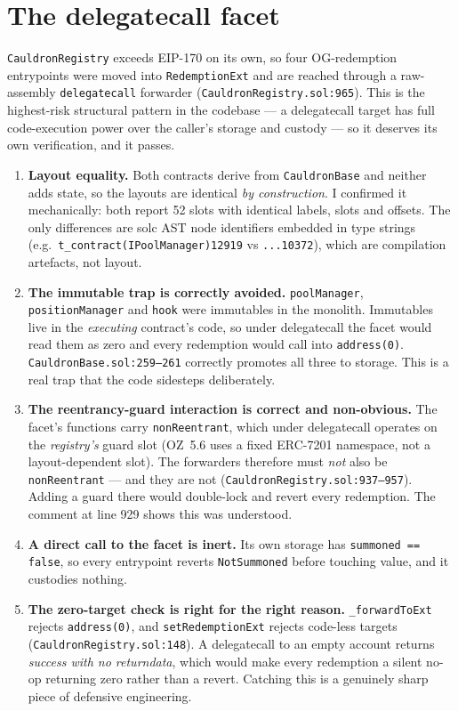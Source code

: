 \documentclass[10pt,a4paper]{article}
\newcommand{\code}[1]{\texttt{\small #1}}
\begin{document}
\section{The delegatecall facet}
\label{sec:facet}

\code{CauldronRegistry} exceeds EIP-170 on its own, so four OG-redemption
entrypoints were moved into \code{RedemptionExt} and are reached through a
raw-assembly \code{delegatecall} forwarder (\code{CauldronRegistry.sol:965}).
This is the highest-risk structural pattern in the codebase --- a delegatecall
target has full code-execution power over the caller's storage and custody ---
so it deserves its own verification, and it passes.

\begin{enumerate}
\item \textbf{Layout equality.} Both contracts derive from
\code{CauldronBase} and neither adds state, so the layouts are identical
\emph{by construction}. I confirmed it mechanically: both report 52 slots with
identical labels, slots and offsets. The only differences are solc AST node
identifiers embedded in type strings (e.g.\ \code{t\_contract(IPoolManager)12919}
vs \code{...10372}), which are compilation artefacts, not layout.

\item \textbf{The immutable trap is correctly avoided.}
\code{poolManager}, \code{positionManager} and \code{hook} were immutables in
the monolith. Immutables live in the \emph{executing} contract's code, so under
delegatecall the facet would read them as zero and every redemption would call
into \code{address(0)}. \code{CauldronBase.sol:259--261} correctly promotes all
three to storage. This is a real trap that the code sidesteps deliberately.

\item \textbf{The reentrancy-guard interaction is correct and non-obvious.}
The facet's functions carry \code{nonReentrant}, which under delegatecall
operates on the \emph{registry's} guard slot (OZ~5.6 uses a fixed ERC-7201
namespace, not a layout-dependent slot). The forwarders therefore must
\emph{not} also be \code{nonReentrant} --- and they are not
(\code{CauldronRegistry.sol:937--957}). Adding a guard there would double-lock
and revert every redemption. The comment at line 929 shows this was understood.

\item \textbf{A direct call to the facet is inert.} Its own storage has
\code{summoned == false}, so every entrypoint reverts \code{NotSummoned} before
touching value, and it custodies nothing.

\item \textbf{The zero-target check is right for the right reason.}
\code{\_forwardToExt} rejects \code{address(0)}, and \code{setRedemptionExt}
rejects code-less targets (\code{CauldronRegistry.sol:148}). A delegatecall to
an empty account returns \emph{success with no returndata}, which would make
every redemption a silent no-op returning zero rather than a revert. Catching
this is a genuinely sharp piece of defensive engineering.
\end{enumerate}
\end{document}
